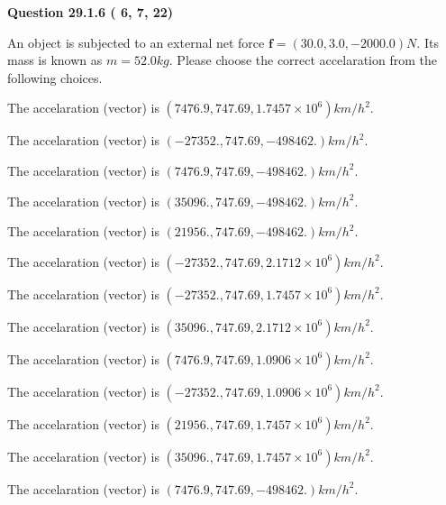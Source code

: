 \documentclass[12pt]{article}
\begin{document}
   
  
\vspace{0.2in}
  
{\textbf{\Large{Question
29.1.6 
 (          6,          7,         22)
}}}
  
  
 
An object is subjected to an external net force $\mathbf{f}=(
30.0 ,
3.0,
-2000.0  )N$. Its mass is known as
$m= %
52.0  kg$. Please choose the correct accelaration
from the following choices.
 
 
 
The accelaration (vector) is
$(
7476.9,
747.69 ,
1.7457 \times 10^{6}
)km/h^2.
$
 
 
The accelaration (vector) is
$(
-27352.,
747.69 ,
-498462.
)km/h^2.
$
 
 
The accelaration (vector) is
$(
7476.9,
747.69 ,
-498462.
)km/h^2.
$
 
 
The accelaration (vector) is
$(
35096.,
747.69 ,
-498462.
)km/h^2.
$
 
 
The accelaration (vector) is
$(
21956.,
747.69 ,
-498462.
)km/h^2.
$
 
 
The accelaration (vector) is
$(
-27352.,
747.69 ,
2.1712 \times 10^{6}
)km/h^2.
$
 
 
The accelaration (vector) is
$(
-27352.,
747.69 ,
1.7457 \times 10^{6}
)km/h^2.
$
 
 
The accelaration (vector) is
$(
35096.,
747.69 ,
2.1712 \times 10^{6}
)km/h^2.
$
 
 
The accelaration (vector) is
$(
7476.9,
747.69 ,
1.0906 \times 10^{6}
)km/h^2.
$
 
 
The accelaration (vector) is
$(
-27352.,
747.69 ,
1.0906 \times 10^{6}
)km/h^2.
$
 
 
The accelaration (vector) is
$(
21956.,
747.69 ,
1.7457 \times 10^{6}
)km/h^2.
$
 
 
The accelaration (vector) is
$(
35096.,
747.69 ,
1.7457 \times 10^{6}
)km/h^2.
$
 
 
\noindent{}
 
 
The accelaration (vector) is
$(
7476.9,
747.69 ,
-498462.
)km/h^2.
$
 
\end{document}
